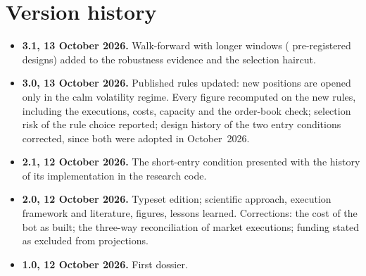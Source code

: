 \documentclass[11pt,a4paper]{article}
\begin{document}
\section{Version history}
\begin{itemize}
\item \textbf{3.1, 13 October 2026.} Walk-forward with longer windows (\WflN{} pre-registered designs) added to the robustness
  evidence and the selection haircut.
\item \textbf{3.0, 13 October 2026.} Published rules updated: new positions are opened only in the calm volatility regime. Every
  figure recomputed on the new rules, including the \NExec{} executions, costs, capacity and the order-book check; selection risk
  of the rule choice reported; design history of the two entry conditions corrected, since both were adopted in October~2026.
\item \textbf{2.1, 12 October 2026.} The short-entry condition presented with the history of its implementation in the research code.
\item \textbf{2.0, 12 October 2026.} Typeset edition; scientific approach, execution framework and literature, figures, lessons
  learned. Corrections: the cost of the bot as built; the three-way reconciliation of market executions; funding stated as
  excluded from projections.
\item \textbf{1.0, 12 October 2026.} First dossier.
\end{itemize}
\end{document}
